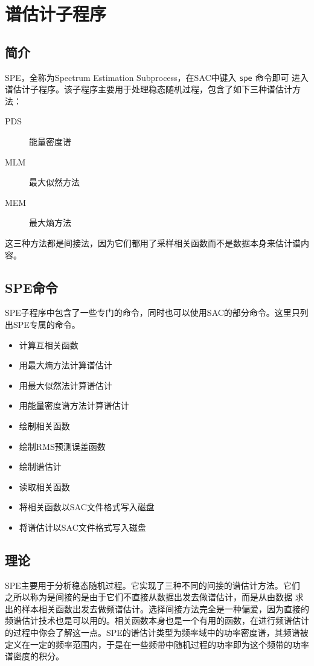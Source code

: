 \section{谱估计子程序}

\subsection{简介}
SPE，全称为Spectrum Estimation Subprocess，在SAC中键入 \texttt{spe} 命令即可
进入谱估计子程序。该子程序主要用于处理稳态随机过程，包含了如下三种谱估计方法：

\begin{description}
\item [PDS] 能量密度谱
\item [MLM] 最大似然方法
\item [MEM] 最大熵方法
\end{description}

这三种方法都是间接法，因为它们都用了采样相关函数而不是数据本身来估计谱内容。

\subsection{SPE命令}
SPE子程序中包含了一些专门的命令，同时也可以使用SAC的部分命令。这里只列出SPE专属的命令。
\begin{itemize}
\item {} 计算互相关函数
\item {} 用最大熵方法计算谱估计
\item {} 用最大似然法计算谱估计
\item {} 用能量密度谱方法计算谱估计
\item {} 绘制相关函数
\item {} 绘制RMS预测误差函数
\item {} 绘制谱估计
\item {} 读取相关函数
\item {} 将相关函数以SAC文件格式写入磁盘
\item {} 将谱估计以SAC文件格式写入磁盘
\end{itemize}

\subsection{理论}
SPE主要用于分析稳态随机过程。它实现了三种不同的间接的谱估计方法。它们
之所以称为是间接的是由于它们不直接从数据出发去做谱估计，而是从由数据
求出的样本相关函数出发去做频谱估计。选择间接方法完全是一种偏爱，因为直接的
频谱估计技术也是可以用的。相关函数本身也是一个有用的函数，在进行频谱估计
的过程中你会了解这一点。SPE的谱估计类型为频率域中的功率密度谱，其频谱被
定义在一定的频率范围内，于是在一些频带中随机过程的功率即为这个频带的功率
谱密度的积分。

